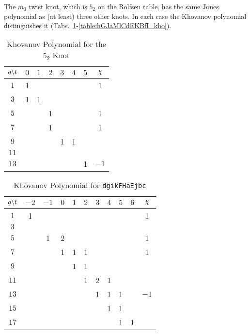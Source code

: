     The $m_{3}$ twist knot, which is $5_{2}$ on the Rolfsen table,
    has the same Jones polynomial as (at least) three other knots. In each
    case the Khovanov polynomial distinguishes it
    (Tabs.~\ref{table:m_3_kho}-\ref{table:hGJaMlCdEKBfI_kho}).
    \begin{table}
        \centering
        \begin{tabular}{| c | c | c | c | c | c | c | c |}
            \hline
            $q\symbol{92}t$&$0$&$1$&$2$&$3$&$4$&$5$&$\chi$\\
            \hline
            $1$&1&&&&&&1\\
            \hline
            $3$&1&1&&&&&\\
            \hline
            $5$&&&1&&&&1\\
            \hline
            $7$&&&1&&&&1\\
            \hline
            $9$&&&&1&1&&\\
            \hline
            $11$&&&&&&&\\
            \hline
            $13$&&&&&&1&$-1$\\
            \hline
        \end{tabular}
        \caption{Khovanov Polynomial for the $5_{2}$ Knot}
        \label{table:m_3_kho}
    \end{table}
    \begin{table}
        \centering
        \begin{tabular}{| c | c | c | c | c | c | c | c | c | c | c |}
            \hline
            $q\symbol{92}t$&$-2$&$-1$&$0$&$1$&$2$&$3$&$4$&$5$&$6$&$\chi$\\
            \hline
            $1$&1&&&&&&&&&1\\
            \hline
            $3$&&&&&&&&&&\\
            \hline
            $5$&&1&2&&&&&&&1\\
            \hline
            $7$&&&1&1&1&&&&&1\\
            \hline
            $9$&&&&1&1&&&&&\\
            \hline
            $11$&&&&&1&2&1&&&\\
            \hline
            $13$&&&&&&1&1&1&&$-1$\\
            \hline
            $15$&&&&&&&1&1&&\\
            \hline
            $17$&&&&&&&&1&1&\\
            \hline
        \end{tabular}
        \caption{Khovanov Polynomial for \texttt{dgikFHaEjbc}}
        \label{table:dgikFHaEjbc_kho}
    \end{table}
